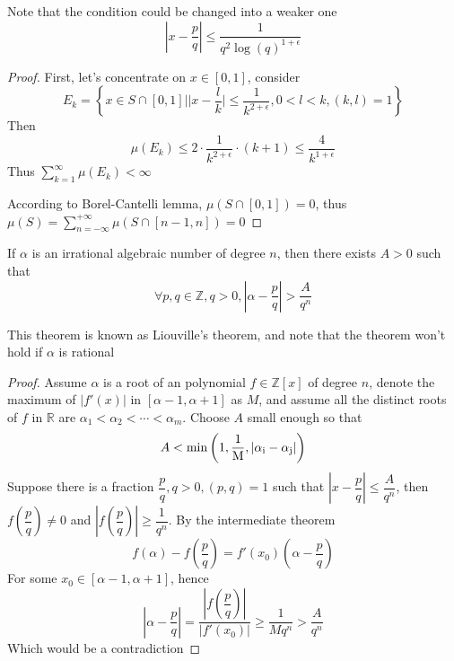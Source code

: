 \begin{remark}
Note that the condition could be changed into a weaker one
$$ \left| x - \dfrac{p}{q} \right| \leq \dfrac{1}{q^{2}\log(q)^{1+\epsilon}} $$
\end{remark}

\begin{proof}
First, let's concentrate on $ x \in [0,1] $, consider 
$$ E_{k} = \left\{ x \in S \cap [0,1] \Big| \Big| x - \dfrac{l}{k} \Big| \leq \dfrac{1}{k^{2+\epsilon}}, 0 < l < k, (k,l) = 1 \right\} $$
Then 
$$ \mu(E_{k}) \leq 2 \cdot \dfrac{1}{k^{2+\epsilon}} \cdot (k+1) \leq \dfrac{4}{k^{1+\epsilon}} $$
Thus $ \displaystyle\sum_{k = 1}^{\infty} \mu(E_{k}) < \infty $ \par
According to Borel-Cantelli lemma, $ \mu(S \cap [0,1]) = 0 $, thus $ \mu(S) = \displaystyle\sum_{n=-\infty}^{+\infty} \mu(S\cap[n-1,n]) = 0 $
\end{proof}

\begin{theorem}\label{theorem 26}
If $ \alpha $ is an irrational algebraic number of degree $ n $, then there exists $ A > 0 $ such that 
$$ \forall p,q \in \mathbb{Z}, q > 0, \left| \alpha - \dfrac{p}{q} \right| > \dfrac{A}{q^{n}} $$
\end{theorem}

\begin{remark}
This theorem is known as Liouville's theorem, and note that the theorem won't hold if $ \alpha $ is rational
\end{remark}

\begin{proof}
Assume $ \alpha $ is a root of an polynomial $ f \in \mathbb{Z}[x] $ of degree $ n $, denote the maximum of $ \left| f'(x) \right| $ in $ [\alpha-1,\alpha+1] $ as $ M $, and assume all the distinct roots of $ f $ in $ \mathbb{R} $ are $ \alpha_{1} < \alpha_{2} < \cdots < \alpha_{m} $. Choose $ A $ small enough so that 
$$ A < \rm{min}\left( 1, \dfrac{1}{M}, \left| \alpha_{i}-\alpha_{j} \right| \right) $$
Suppose there is a fraction $ \dfrac{p}{q}, q > 0, (p,q) = 1 $ such that $ \left| x - \dfrac{p}{q} \right| \leq \dfrac{A}{q^{n}} $, then $ f\left(\dfrac{p}{q}\right) \neq 0 $ and $ \left| f\left(\dfrac{p}{q}\right) \right| \geq \dfrac{1}{q^{n}} $. By the intermediate theorem
$$ f\left(\alpha\right) - f\left(\dfrac{p}{q}\right) = f'\left(x_{0}\right)\left( \alpha - \dfrac{p}{q} \right) $$
For some $ x_{0} \in [\alpha-1,\alpha+1] $, hence
$$ \left| \alpha - \dfrac{p}{q} \right| = \dfrac{\left| f(\dfrac{p}{q}) \right|}{\left| f'(x_{0}) \right|} \geq \dfrac{1}{Mq^{n}} > \dfrac{A}{q^{n}} $$
Which would be a contradiction
\end{proof}

